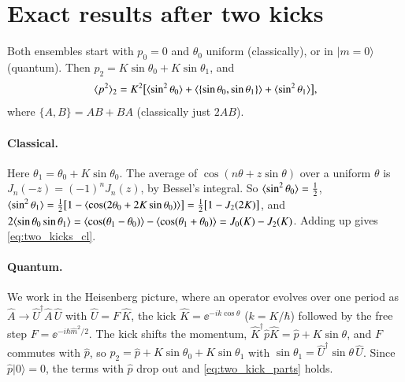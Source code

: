 \section{Exact results after two kicks}
\label{app:two_kicks}

Both ensembles start with $p_0 = 0$ and $\theta_0$ uniform (classically), or in $|m = 0\rangle$ (quantum). Then
$p_2 = K\sin\theta_0 + K\sin\theta_1$, and
\begin{equation}
  \langle p^2 \rangle_2 = K^2\bigl[\langle \sin^2\theta_0 \rangle + \langle \{\sin\theta_0, \sin\theta_1\} \rangle + \langle \sin^2\theta_1 \rangle\bigr],
  \label{eq:two_kick_parts}
\end{equation}
where $\{A, B\} = AB + BA$ (classically just $2AB$).

\paragraph{Classical.}
Here $\theta_1 = \theta_0 + K\sin\theta_0$. The average of $\cos(n\theta + z\sin\theta)$ over a uniform $\theta$
is $J_n(-z) = (-1)^n J_n(z)$, by Bessel's integral. So $\langle \sin^2\theta_0 \rangle = \tfrac12$,
$\langle \sin^2\theta_1 \rangle = \tfrac12\bigl[1 - \langle \cos(2\theta_0 + 2K\sin\theta_0) \rangle\bigr] = \tfrac12\bigl[1 -
J_2(2K)\bigr]$, and
$2\langle \sin\theta_0\sin\theta_1 \rangle = \langle \cos(\theta_1 - \theta_0) \rangle - \langle \cos(\theta_1 + \theta_0) \rangle =
J_0(K) - J_2(K)$. Adding up gives \cref{eq:two_kicks_cl}.

\paragraph{Quantum.}
We work in the Heisenberg picture, where an operator evolves over one period as
$\hat A \to \hat U^\dagger\hat A\,\hat U$ with $\hat U = F\,\hat K$, the kick
$\hat K = \ee^{-ik\cos\theta}$ ($k = K/\hbar$) followed by the free step $F = \ee^{-i\hbar\hat m^2/2}$. The kick
shifts the momentum, $\hat K^\dagger\hat p\hat K = \hat p + K\sin\theta$, and $F$ commutes with $\hat p$, so
$p_2 = \hat p + K\sin\theta_0 + K\sin\theta_1$ with $\sin\theta_1 = \hat U^\dagger\sin\theta\,\hat U$. Since
$\hat p|0\rangle = 0$, the terms with $\hat p$ drop out and \cref{eq:two_kick_parts} holds.

